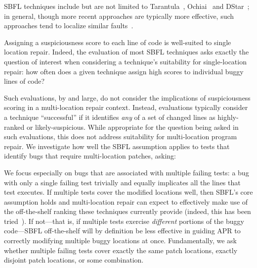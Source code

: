 \documentclass[10pt, conference]{IEEEtran}
\begin{document}

SBFL techniques include but are not limited to Tarantula~\cite{tarantula},
Ochiai~\cite{ochiai} and DStar~\cite{wong2013dstar}; in general, though more
recent approaches are typically more effective, such approaches tend to localize similar
faults~\cite{zou2019empirical}.

Assigning a suspiciousness score to each line of code is well-suited to single
location repair. Indeed, the evaluation of most SBFL techniques asks exactly the
question of interest when considering a technique's suitability for
single-location repair: how often does a given technique assign high scores to 
individual buggy lines of code?

Such evaluations, by and large, do not consider the implications of
suspiciousness scoring in a multi-location repair context.  Instead, evaluations
typically consider a technique ``successful'' if it identifies \emph{any} of a
set of changed lines as highly-ranked or likely-suspicious.  While appropriate
for the question being asked in such evaluations, this does not address
suitability for multi-location program repair.%
We investigate how well the SBFL assumption
applies to tests that identify bugs that require multi-location patches, asking: 


We focus especially on bugs that are associated with multiple failing tests: a bug
with only a single failing test trivially and equally implicates all the lines
that test executes.  If multiple tests cover the modified locations well, then
SBFL's core assumption holds and multi-location repair can expect to effectively
make use of the off-the-shelf ranking these techniques currently provide
(indeed, this has been tried~\cite{angelix}). If not---that is, if multiple
tests exercise \emph{different} portions of the buggy code---SBFL off-the-shelf
will by definition be less effective in guiding APR to correctly modifying
multiple buggy locations at once.
Fundamentally, we ask whether multiple failing tests cover exactly the same
patch locations, exactly disjoint patch locations, or some combination.
\end{document}
